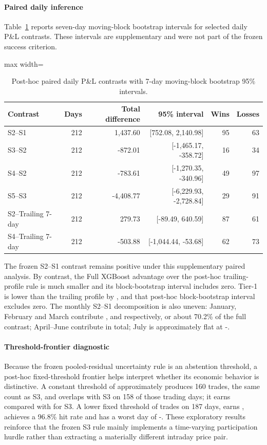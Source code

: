 \paragraph{Paired daily inference}
Table~\ref{tab:posthoc_bootstrap} reports seven-day moving-block bootstrap intervals for selected daily P\&L contrasts. These intervals are supplementary and were not part of the frozen success criterion.

\begin{table}[htbp]
\centering
\caption{Post-hoc paired daily P\&L contrasts with 7-day moving-block bootstrap 95\% intervals.}
\label{tab:posthoc_bootstrap}
\begin{adjustbox}{max width=\textwidth}
\begin{tabular}{lrrrrr}
\toprule
Contrast & Days & Total difference & 95\% interval & Wins & Losses \\
\midrule
S2--S1 & 212 & 1,437.60 & [752.08, 2,140.98] & 95 & 63 \\
S3--S2 & 212 & -872.01 & [-1,465.17, -358.72] & 16 & 34 \\
S4--S2 & 212 & -783.61 & [-1,270.35, -340.96] & 49 & 97 \\
S5--S3 & 212 & -4,408.77 & [-6,229.93, -2,728.84] & 29 & 91 \\
S2--Trailing 7-day & 212 & 279.73 & [-89.49, 640.59] & 87 & 61 \\
S4--Trailing 7-day & 212 & -503.88 & [-1,044.44, -53.68] & 62 & 73 \\
\bottomrule
\end{tabular}
\end{adjustbox}
\end{table}

The frozen S2--S1 contrast remains positive under this supplementary paired analysis. By contrast, the Full XGBoost advantage over the post-hoc trailing-profile rule is much smaller and its block-bootstrap interval includes zero. Tier-1 is lower than the trailing profile by , and that post-hoc block-bootstrap interval excludes zero. The monthly S2--S1 decomposition is also uneven: January, February and March contribute ,  and  respectively, or about 70.2\% of the full  contrast; April--June contribute  in total; July is approximately flat at -.

\paragraph{Threshold-frontier diagnostic}
Because the frozen pooled-residual uncertainty rule is an abstention threshold, a post-hoc fixed-threshold frontier helps interpret whether its economic behavior is distinctive. A constant threshold of approximately  produces 160 trades, the same count as S3, and overlaps with S3 on 158 of those trading days; it earns  compared with  for S3. A lower fixed threshold of  trades on 187 days, earns , achieves a 96.8\% hit rate and has a worst day of -. These exploratory results reinforce that the frozen S3 rule mainly implements a time-varying participation hurdle rather than extracting a materially different intraday price pair.

